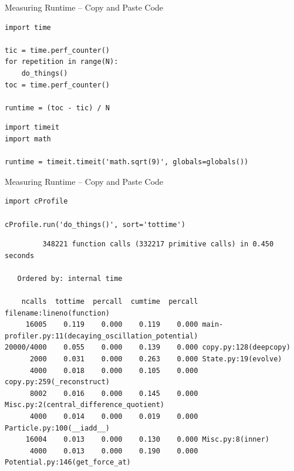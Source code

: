 \begin{frame}[fragile]{Measuring Runtime -- Copy and Paste Code}
%
\begin{codebox}
\begin{verbatim}
import time

tic = time.perf_counter()
for repetition in range(N):
    do_things()
toc = time.perf_counter()

runtime = (toc - tic) / N
\end{verbatim}
\end{codebox}
%
\begin{codebox}
\begin{verbatim}
import timeit
import math

runtime = timeit.timeit('math.sqrt(9)', globals=globals())
\end{verbatim}
\end{codebox}
%
\end{frame}


\begin{frame}[fragile]{Measuring Runtime -- Copy and Paste Code}
%
\begin{codebox}
\begin{verbatim}
import cProfile

cProfile.run('do_things()', sort='tottime')
\end{verbatim}
\end{codebox}
%
\begin{cmdbox}
\begin{verbatim}
         348221 function calls (332217 primitive calls) in 0.450 seconds

   Ordered by: internal time

    ncalls  tottime  percall  cumtime  percall filename:lineno(function)
     16005    0.119    0.000    0.119    0.000 main-profiler.py:11(decaying_oscillation_potential)
20000/4000    0.055    0.000    0.139    0.000 copy.py:128(deepcopy)
      2000    0.031    0.000    0.263    0.000 State.py:19(evolve)
      4000    0.018    0.000    0.105    0.000 copy.py:259(_reconstruct)
      8002    0.016    0.000    0.145    0.000 Misc.py:2(central_difference_quotient)
      4000    0.014    0.000    0.019    0.000 Particle.py:100(__iadd__)
     16004    0.013    0.000    0.130    0.000 Misc.py:8(inner)
      4000    0.013    0.000    0.190    0.000 Potential.py:146(get_force_at)
\end{verbatim}
\end{cmdbox}
%
\end{frame}


